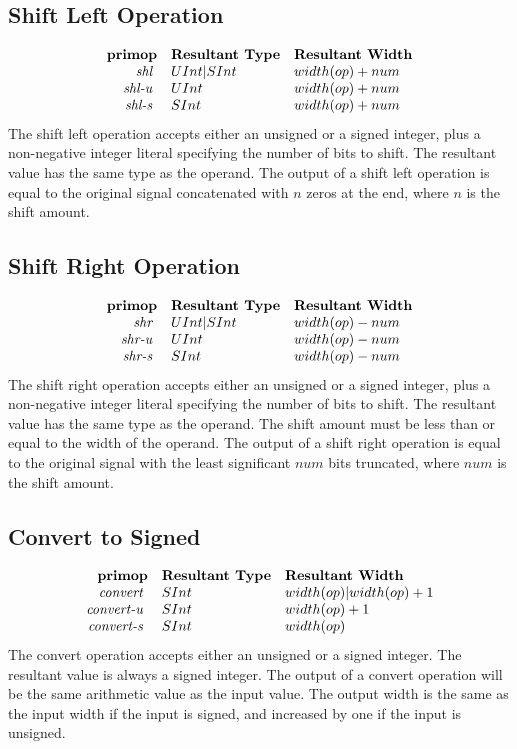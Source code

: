 \documentclass[12pt]{article}
\begin{document}
\subsection{Shift Left Operation}
\[
\begin{array}{rll}
\text{\bf primop} & \text{\bf Resultant Type} & \text{\bf Resultant Width} \\
\text{\em shl\ }        & UInt|SInt & width(op) + num \\
\text{\em shl-u\ }      & UInt & width(op) + num \\
\text{\em shl-s\ }      & SInt & width(op) + num \\
\end{array}
\]
The shift left operation accepts either an unsigned or a signed integer, plus a non-negative integer literal specifying the number of bits to shift.
The resultant value has the same type as the operand.
The output of a shift left operation is equal to the original signal concatenated with $n$ zeros at the end, where $n$ is the shift amount.

\subsection{Shift Right Operation}
\[
\begin{array}{rll}
\text{\bf primop} & \text{\bf Resultant Type} & \text{\bf Resultant Width} \\
\text{\em shr\ }        & UInt|SInt & width(op) - num \\
\text{\em shr-u\ }      & UInt & width(op) - num \\
\text{\em shr-s\ }      & SInt & width(op) - num \\
\end{array}
\]
The shift right operation accepts either an unsigned or a signed integer, plus a non-negative integer literal specifying the number of bits to shift.
The resultant value has the same type as the operand.
The shift amount must be less than or equal to the width of the operand.
The output of a shift right operation is equal to the original signal with the least significant $num$ bits truncated, where $num$ is the shift amount.

\subsection{Convert to Signed}
\[
\begin{array}{rll}
\text{\bf primop} & \text{\bf Resultant Type} & \text{\bf Resultant Width} \\
\text{\em convert\ }        & SInt & width(op)|width(op) + 1 \\
\text{\em convert-u\ }      & SInt & width(op) + 1 \\
\text{\em convert-s\ }      & SInt & width(op) \\
\end{array}
\]
The convert operation accepts either an unsigned or a signed integer.
The resultant value is always a signed integer.
The output of a convert operation will be the same arithmetic value as the input value.
The output width is the same as the input width if the input is signed, and increased by one if the input is unsigned.
\end{document}
